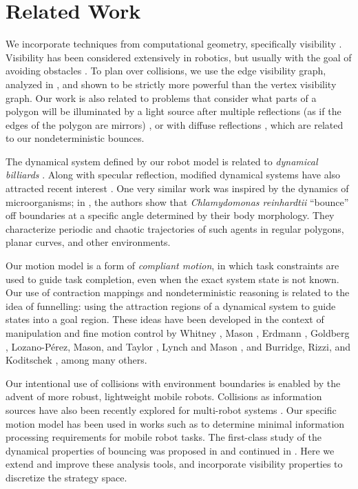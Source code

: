 \documentclass[]{styles/svproc}  %
\begin{document}
\section{Related Work}

We incorporate techniques from computational geometry, specifically visibility
\cite{ghosh2007visibility}. Visibility has been considered extensively in
robotics, but usually with the goal of avoiding obstacles
\cite{lozano1979algorithm,SimLauNis00}. To plan over collisions, we use the edge
visibility graph, analyzed in \cite{rourke_viz}, and shown to be strictly more
powerful than the vertex visibility graph. Our work is also related to problems
that consider what parts of a polygon will be illuminated by a light source
after multiple reflections (as if the edges of the polygon are mirrors)
\cite{Aronov1996}, or with diffuse reflections \cite{prasad1998visibility},
which are related to our nondeterministic bounces.

The dynamical system defined by our robot model is related to
\emph{dynamical billiards} \cite{billiards}. Along with specular reflection,
modified dynamical systems have also attracted recent interest
\cite{DelMagno2014,pinball,billiards}. One very similar work was inspired by the
dynamics of microorganisms; in \cite{microorganism2017}, the authors show that
\textit{Chlamydomonas reinhardtii} ``bounce'' off boundaries at a specific
angle determined by their body morphology. They characterize periodic and
chaotic trajectories of such agents in regular polygons, planar curves, and
other environments.

Our motion model is a
form of \emph{compliant motion}, in which task constraints are used to guide task
completion, even when the exact system state is not known. Our use of
contraction mappings and nondeterministic reasoning is
related to the idea of funnelling: using
the attraction regions of a dynamical system to guide states into a goal region.
These ideas have been developed in the context of manipulation and fine motion control by Whitney
\cite{Whi77}, Mason \cite{Mas85}, Erdmann
\cite{Erd86}, Goldberg \cite{Gol93}, Lozano-P{\'e}rez, Mason, and Taylor
\cite{LozMasTay84}, Lynch and Mason \cite{LynMas95}, and Burridge, Rizzi, and Koditschek
\cite{BurRizKod99}, among many others.

Our intentional use of collisions with
environment boundaries is enabled by the advent of more robust, lightweight mobile
robots. Collisions as information sources have also been
recently explored for multi-robot systems \cite{mayya2018localization}. Our
specific motion model has been used in works such as \cite{OkaLav06} to
determine minimal information processing requirements for mobile robot tasks.
The first-class study of the dynamical properties of bouncing was proposed in
\cite{ErLav13} and continued in \cite{NilBecLav17}. Here we extend and improve
these analysis tools, and incorporate visibility properties to
discretize the strategy space.
\end{document}
